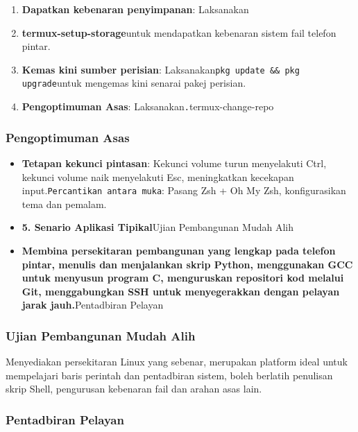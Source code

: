 \begin{enumerate}
  \item \textbf{Dapatkan kebenaran penyimpanan}: Laksanakan
  \item \textbf{termux-setup-storage}untuk mendapatkan kebenaran sistem fail telefon pintar.
  \item \textbf{Kemas kini sumber perisian}: Laksanakan\texttt{pkg update \&\& pkg upgrade}untuk mengemas kini senarai pakej perisian.
  \item \textbf{Pengoptimuman Asas}: Laksanakan\texttt{.\allowbreak }termux-change-repo
\end{enumerate}

\subsubsection*{Pengoptimuman Asas}

\begin{itemize}
  \item \textbf{Tetapan kekunci pintasan}: Kekunci volume turun menyelakuti Ctrl, kekunci volume naik menyelakuti Esc, meningkatkan kecekapan input.\texttt{Percantikan antara muka}: Pasang Zsh + Oh My Zsh, konfigurasikan tema dan pemalam.
  \item \textbf{5. Senario Aplikasi Tipikal}Ujian Pembangunan Mudah Alih
  \item \textbf{Membina persekitaran pembangunan yang lengkap pada telefon pintar, menulis dan menjalankan skrip Python, menggunakan GCC untuk menyusun program C, menguruskan repositori kod melalui Git, menggabungkan SSH untuk menyegerakkan dengan pelayan jarak jauh.}Pentadbiran Pelayan
\end{itemize}


\subsubsection*{Ujian Pembangunan Mudah Alih}

Menyediakan persekitaran Linux yang sebenar, merupakan platform ideal untuk mempelajari baris perintah dan pentadbiran sistem, boleh berlatih penulisan skrip Shell, pengurusan kebenaran fail dan arahan asas lain.

\subsubsection*{Pentadbiran Pelayan}

